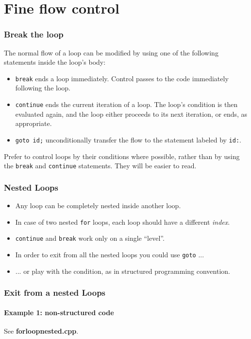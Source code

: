 \documentclass[12pt]{beamer}
\begin{document}
\section{Fine flow control}

\begin{frame}
	\frametitle{Break the loop}
	The normal flow of a loop can be modified by using one of the following statements inside the loop's body:
	\begin{itemize}
		\item \lstinline/break/ ends a loop immediately. Control passes
			to the code immediately following the loop.
		\item \lstinline/continue/ ends the current iteration of a
			loop. The loop's condition is then evaluated again, and
			the loop either proceeds to its next iteration, or
			ends, as appropriate.
		\item \lstinline/goto id;/ unconditionally transfer the flow to the statement labeled by \lstinline/id:/.
	\end{itemize}

	Prefer to control loops by their conditions where possible, rather than by using the \lstinline/break/ and \lstinline/continue/ statements. They will be easier to read.
\end{frame}

\begin{frame}
	\frametitle{Nested Loops}
	\begin{itemize}
        \item  Any loop can be completely nested inside another loop.
		\item In case of two nested \lstinline/for/ loops, each loop should have a different \textit{index}.
		\item \lstinline/continue/ and \lstinline/break/ work only on a single ``level''.
		\item In order to exit from all the nested loops you could use \lstinline/goto/ ...
		\item ... or play with the condition, as in  structured programming convention.
	\end{itemize}
\end{frame}


\begin{frame}
	\frametitle{Exit from a nested Loops}
    \framesubtitle{Example 1: non-structured code}
\LstNestedGoto
    See \textbf{forloopnested.cpp}.
\end{frame}
\end{document}
